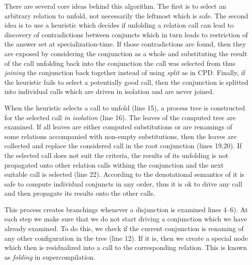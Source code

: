 There are several core ideas behind this algorithm.
The first is to select an arbitrary relation to unfold, not necessarily the leftmost which is safe.
The second idea is to use a heuristic which decides if unfolding a relation call can lead to discovery of contradictions between conjuncts which in turn leads to restriction of the answer set at specialization-time.
If those contradictions are found, then they are exposed by considering the conjunction as a whole and substituting the result of the call unfolding back into the conjunction the call was selected from thus \emph{joining} the conjunction back together instead of using \emph{split} as in CPD.
Finally, if the heuristic fails to select a potentially good call, then the conjunction is splitted into individual calls which are driven in isolation and are never joined.

When the heuristic selects a call to unfold (line 15), a process tree is constructed for the selected call \emph{in isolation} (line 16).
The leaves of the computed tree are examined.
If all leaves are either computed substitutions or are renamings of some relations accompanied with non-empty substitutions, then the leaves are collected and replace the considered call in the root conjunction (lines 19,20).
If the selected call does not suit the criteria, the results of its unfolding is not propagated onto other relation calls withing the conjunction and the next suitable call is selected (line 22).
According to the denotational semantics of \mk{} it is safe to compute individual conjuncts in any order, thus it is ok to drive any call and then propagate its results onto the other calls.


This process creates branchings whenever a disjunction is examined lines 4--6).
At each step we make sure that we do not start driving a conjunction which we have already examined.
To do this, we check if the current conjunction is renaming of any other configuration in the tree (line 12).
If it is, then we create a special node which then is residualized into a call to the corresponding relation.
This is known as \emph{folding} in supercompilation.

